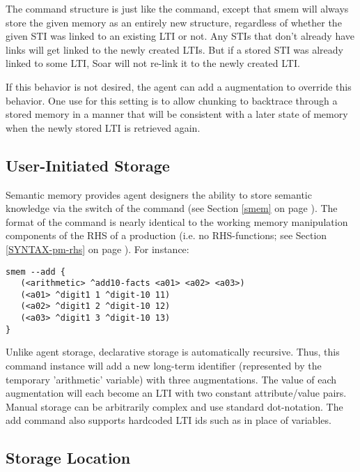The  command structure is just like the  command, except that smem will always store the given memory as an entirely new structure, regardless of whether the given STI was linked to an existing LTI or not. Any STIs that don't already have links will get linked to the newly created LTIs. But if a stored STI was already linked to some LTI, Soar will not re-link it to the newly created LTI. 

If this behavior is not desired, the agent can add a  augmentation to override this behavior. One use for this setting is to allow chunking to backtrace through a stored memory in a manner that will be consistent with a later state of memory when the newly stored LTI is retrieved again.

\subsection{User-Initiated Storage}

Semantic memory provides agent designers the ability to store semantic knowledge via the  switch of the  command (see Section \ref{smem} on page \pageref{smem}).  
The format of the command is nearly identical to the working memory manipulation components of the RHS of a production (i.e. no RHS-functions; see Section \ref{SYNTAX-pm-rhs} on page \pageref{SYNTAX-pm-rhs}).  
For instance:

\begin{verbatim}
smem --add {
   (<arithmetic> ^add10-facts <a01> <a02> <a03>)
   (<a01> ^digit1 1 ^digit-10 11)
   (<a02> ^digit1 2 ^digit-10 12)
   (<a03> ^digit1 3 ^digit-10 13)
}
\end{verbatim}

Unlike agent storage, declarative storage is automatically recursive.  
Thus, this command instance will add a new long-term identifier (represented by the temporary 'arithmetic' variable) with three augmentations.  
The value of each augmentation will each become an LTI with two constant attribute/value pairs.  
Manual storage can be arbitrarily complex and use standard dot-notation.
The add command also supports hardcoded LTI ids such as  in place of variables.

\subsection{Storage Location}


